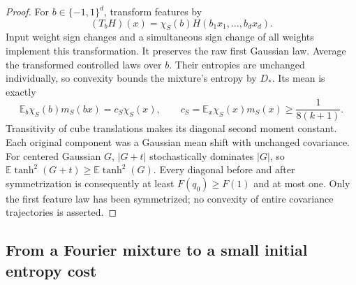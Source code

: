 \begin{proof}
For $b\in\{-1,1\}^d$, transform features by
\[
 (T_bH)(x)=\chi_S(b)H(b_1x_1,\ldots,b_dx_d).
\]
Input weight sign changes and a simultaneous sign change of all weights
implement this transformation. It preserves the raw first Gaussian
law. Average the transformed controlled laws over $b$.
Their entropies are unchanged individually, so convexity bounds the
mixture's entropy by $D_*$. Its mean is exactly
\[
 \mathbb E_b\chi_S(b)m_S(bx)
   =c_S\chi_S(x),\qquad
 c_S=\mathbb E_x\chi_S(x)m_S(x)\ge\frac1{8(k+1)}.
\]
Transitivity of cube translations makes its diagonal second moment
constant. Each original component was a Gaussian mean shift with
unchanged covariance. For centered Gaussian $G$, $|G+t|$ stochastically
dominates $|G|$, so
$\mathbb E\tanh^2(G+t)\ge\mathbb E\tanh^2(G)$.
Every diagonal before and after symmetrization is consequently at least
$F(q_0)\ge F(1)$ and at most one.
Only the first feature law has been symmetrized; no convexity of entire
covariance trajectories is asserted.
\end{proof}

\subsection{From a Fourier mixture to a small initial entropy cost}

